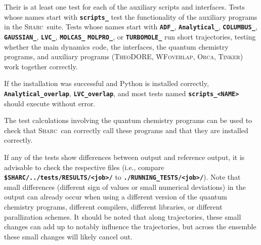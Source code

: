 \documentclass[a4paper,10pt,DIV=15,openany]{scrbook}
\newcommand{\sharc}{\textsc{Sharc}}
\newcommand{\ttt}[1]{\textbf{\texttt{#1}}}
\begin{document}
Their is at least one test for each of the auxiliary scripts and interfaces. 
Tests whose names start with \ttt{scripts\_} test the functionality of the auxiliary programs in the \sharc\ suite.
Tests whose names start with \ttt{ADF\_}, \ttt{Analytical\_}, \ttt{COLUMBUS\_}, \ttt{GAUSSIAN\_}, \ttt{LVC\_}, \ttt{MOLCAS\_} \ttt{MOLPRO\_}, or \ttt{TURBOMOLE\_} run short trajectories, testing whether the main dynamics code, the interfaces, the quantum chemistry programs, and auxiliary programs (\textsc{TheoDORE}, \textsc{WFoverlap}, \textsc{Orca}, \textsc{Tinker}) work together correctly.


If the installation was successful and Python is installed correctly, \ttt{Analytical\_overlap}, \ttt{LVC\_overlap}, and most tests named \ttt{scripts\_<NAME>} should execute without error. 

The test calculations involving the quantum chemistry programs can be used to check that \sharc\ can correctly call these programs and that they are installed correctly.

If any of the tests show differences between output and reference output, it is advisable to check the respective files (i.e., compare \ttt{\$SHARC/../tests/RESULTS/<job>/} to \ttt{./RUNNING\_TESTS/<job>/}). Note that small differences (different sign of values or small numerical deviations) in the output can already occur when using a different version of the quantum chemistry programs, different compilers, different libraries, or different parallization schemes.
It should be noted that along trajectories, these small changes can add up to notably influence the trajectories, but across the ensemble these small changes will likely cancel out.
\end{document}
